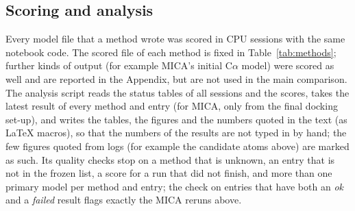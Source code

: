 \subsection{Scoring and analysis}
Every model file that a method wrote was scored in CPU sessions with the same notebook code. The scored file of each method is fixed in Table~\ref{tab:methods}; further kinds of output (for example MICA's initial C$\alpha$ model) were scored as well and are reported in the Appendix, but are not used in the main comparison. The analysis script reads the status tables of all sessions and the scores, takes the latest result of every method and entry (for MICA, only from the final docking set-up), and writes the tables, the figures and the numbers quoted in the text (as \LaTeX{} macros), so that the numbers of the results are not typed in by hand; the few figures quoted from logs (for example the candidate atoms above) are marked as such. Its quality checks stop on a method that is unknown, an entry that is not in the frozen list, a score for a run that did not finish, and more than one primary model per method and entry; the check on entries that have both an \emph{ok} and a \emph{failed} result flags exactly the \NRerunMica{} MICA reruns above.
